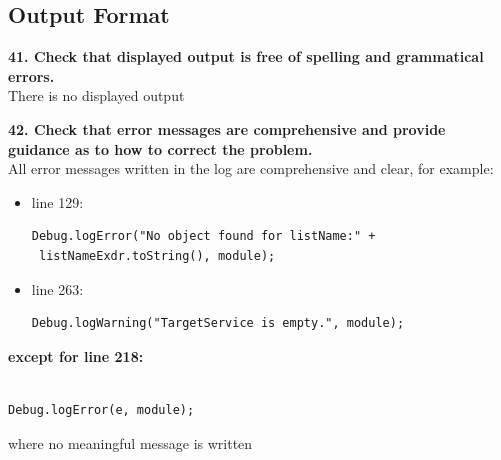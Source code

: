 \documentclass{article}
\begin{document}
\begin{flushleft}
\begin{itemize}
\end{itemize}
\vspace{0.5cm}



\subsection{Output Format}
\textbf{41. Check that displayed output is free of spelling and grammatical errors.}\\
\vspace{0.5cm}
There is no displayed output\\
\vspace{0.5cm}

\textbf{42. Check that error messages are comprehensive and provide guidance as to how to correct the problem.}\\
\vspace{0.5cm}
All error messages written in the log are comprehensive and clear, for example:\\
\vspace{0.5cm}

\begin{itemize}

\item line 129: \\
\vspace{0.5cm}
\begin{lstlisting}
Debug.logError("No object found for listName:" +
 listNameExdr.toString(), module);
\end{lstlisting}
\vspace{0.5cm}

\item line 263: \\
\vspace{0.5cm}
\begin{lstlisting}
Debug.logWarning("TargetService is empty.", module);
\end{lstlisting}
\end{itemize}
\vspace{0.5cm}

\textbf{except for line 218:}\\
\vspace{0.5cm}
\begin{lstlisting}

Debug.logError(e, module); 
\end{lstlisting}
\vspace{0.5cm}
where no meaningful message is written\\
\vspace{0.5cm}


\end{flushleft}
\end{document}
